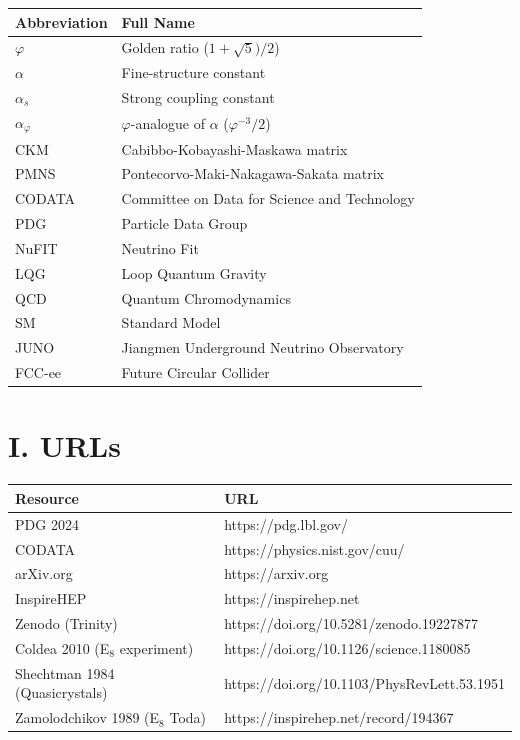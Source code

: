 \documentclass[10pt,a4paper]{article}
\begin{document}
\begin{tabular}{ll}
\textbf{Abbreviation} & \textbf{Full Name} \\
\midrule
$\varphi$ & Golden ratio ($1+\sqrt{5})/2$) \\
$\alpha$ & Fine-structure constant \\
$\alpha_s$ & Strong coupling constant \\
$\alpha_\varphi$ & $\varphi$-analogue of $\alpha$ ($\varphi^{-3}/2$) \\
CKM & Cabibbo-Kobayashi-Maskawa matrix \\
PMNS & Pontecorvo-Maki-Nakagawa-Sakata matrix \\
CODATA & Committee on Data for Science and Technology \\
PDG & Particle Data Group \\
NuFIT & Neutrino Fit \\
LQG & Loop Quantum Gravity \\
QCD & Quantum Chromodynamics \\
SM & Standard Model \\
JUNO & Jiangmen Underground Neutrino Observatory \\
FCC-ee & Future Circular Collider \\
\end{tabular}

\section*{I. URLs}

\begin{tabular}{ll}
\textbf{Resource} & \textbf{URL} \\
\midrule
PDG 2024 & https://pdg.lbl.gov/ \\
CODATA & https://physics.nist.gov/cuu/ \\
arXiv.org & https://arxiv.org \\
InspireHEP & https://inspirehep.net \\
Zenodo (Trinity) & https://doi.org/10.5281/zenodo.19227877 \\
Coldea 2010 (E$_8$ experiment) & https://doi.org/10.1126/science.1180085 \\
Shechtman 1984 (Quasicrystals) & https://doi.org/10.1103/PhysRevLett.53.1951 \\
Zamolodchikov 1989 (E$_8$ Toda) & https://inspirehep.net/record/194367 \\
\end{tabular}
\end{document}
